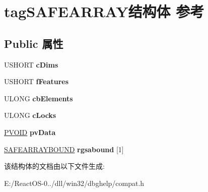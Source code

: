 \hypertarget{structtag_s_a_f_e_a_r_r_a_y}{}\section{tag\+S\+A\+F\+E\+A\+R\+R\+A\+Y结构体 参考}
\label{structtag_s_a_f_e_a_r_r_a_y}
\subsection*{Public 属性}
\begin{DoxyCompactItemize}
\item 
\mbox{\label{structtag_s_a_f_e_a_r_r_a_y_a63149a7b4fafdee5f5bc8ff6258f37b7}} 
U\+S\+H\+O\+RT {\bfseries c\+Dims}
\item 
\mbox{\label{structtag_s_a_f_e_a_r_r_a_y_a13cde69079d683f2abb7fa790132c6d1}} 
U\+S\+H\+O\+RT {\bfseries f\+Features}
\item 
\mbox{\label{structtag_s_a_f_e_a_r_r_a_y_a90a3d397bfbf8b49d273159a37392176}} 
U\+L\+O\+NG {\bfseries cb\+Elements}
\item 
\mbox{\label{structtag_s_a_f_e_a_r_r_a_y_a529a216db95ca3e3f9f6f7b582885c59}} 
U\+L\+O\+NG {\bfseries c\+Locks}
\item 
\mbox{\label{structtag_s_a_f_e_a_r_r_a_y_a76c18b938fb327e1ef739158f93c6e5f}} 
\hyperlink{interfacevoid}{P\+V\+O\+ID} {\bfseries pv\+Data}
\item 
\mbox{\label{structtag_s_a_f_e_a_r_r_a_y_a24221eb1908cfcab44ba136249c3adf8}} 
\hyperlink{structtag_s_a_f_e_a_r_r_a_y_b_o_u_n_d}{S\+A\+F\+E\+A\+R\+R\+A\+Y\+B\+O\+U\+ND} {\bfseries rgsabound} \mbox{[}1\mbox{]}
\end{DoxyCompactItemize}


该结构体的文档由以下文件生成\+:\begin{DoxyCompactItemize}
\item 
E\+:/\+React\+O\+S-\/0../dll/win32/dbghelp/compat.\+h\end{DoxyCompactItemize}
